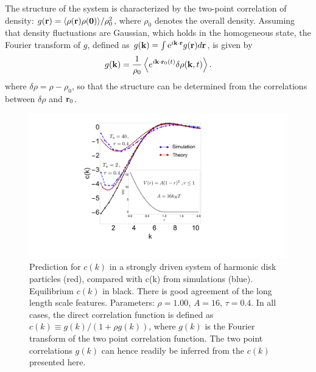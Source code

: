 \documentclass[superscriptaddress, twocolumn, prl, longbibliography, nofootinbib]{revtex4-1}
\begin{document}
The structure of the system is characterized by the two-point correlation of density: $g({\bf r} ) = \langle \rho({\bf r}) \rho({\bf 0}) \rangle/\rho_0^2 $, where $\rho_0$ denotes the overall density. Assuming that density fluctuations are Gaussian, which holds in the homogeneous state, the Fourier transform of $g$, defined as $g({\bf k}) = \int {\rm e}^{i{\bf k}\cdot{\bf r}} g({\bf r})d{\bf r}$, is given by
\begin{equation}\label{eq:gk}
    g({\bf k}) = \frac{1}{\rho_0} \left \langle  e^{i{\bf k} \cdot {\bf r}_0 (t) } \delta\rho ({\bf k}, t) \right \rangle.
\end{equation}
where $\delta\rho=\rho-\rho_0$, so that the structure can be determined from the correlations between $\delta\rho$ and ${\bf r}_0$.


\begin{figure}
    \includegraphics[scale=0.275, clip=True]{Fig1_full_new_cut.pdf}
    \caption{Prediction for $c(k)$ in a strongly driven system of harmonic disk particles (red), compared with c(k) from simulations (blue). Equilibrium $c(k)$ in black. There is good agreement of the long length scale features. Parameters: $\rho = 1.00$, $A = 16$, $\tau = 0.4$. In all cases, the direct correlation function is defined as $c(k)\equiv g(k)/(1+\rho g(k))$, where $g(k)$ is the Fourier transform of the two point correlation function. The two point correlations $g(k)$ can hence readily be inferred from the $c(k)$ presented here.} 
    \label{Fig:1}
\end{figure}

\end{document}
